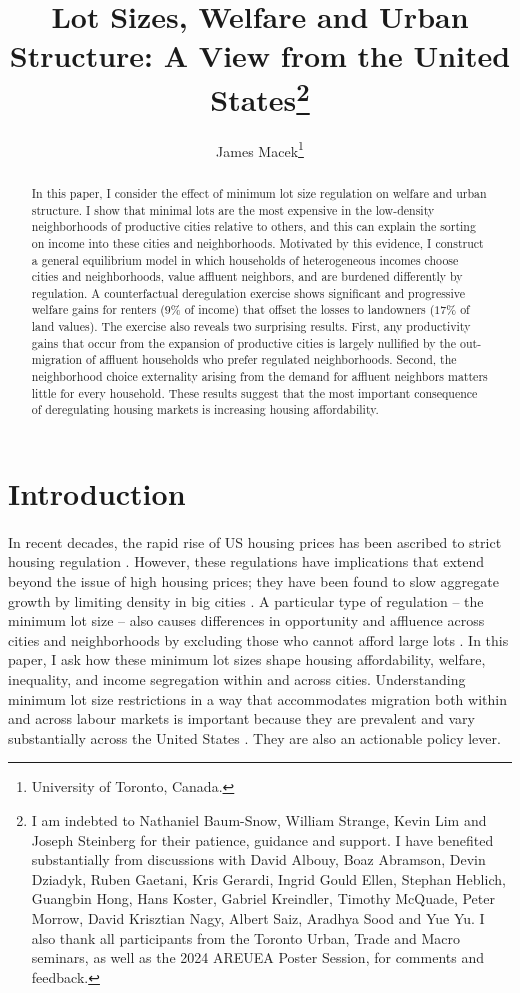 \documentclass[12pt]{article}
\title{Lot Sizes, Welfare and Urban Structure: A View from the United States\footnote{\scriptsize I am indebted to Nathaniel Baum-Snow, William Strange, Kevin Lim and Joseph Steinberg for their patience, guidance and support. I have benefited substantially from discussions with David Albouy, Boaz Abramson, Devin Dziadyk, Ruben Gaetani, Kris Gerardi, Ingrid Gould Ellen, Stephan Heblich, Guangbin Hong, Hans Koster, Gabriel Kreindler, Timothy McQuade, Peter Morrow, David Krisztian Nagy, Albert Saiz, Aradhya Sood and Yue Yu. I also thank all participants from the Toronto Urban, Trade and Macro seminars, as well as the 2024 AREUEA Poster Session, for comments and feedback.}}
\author{James Macek\footnote{\scriptsize University of Toronto, Canada.}}
\begin{document}
\maketitle	
		
\begin{abstract}
	\footnotesize
In this paper, I consider the effect of minimum lot size regulation on welfare and urban structure. I show that minimal lots are the most expensive in the low-density neighborhoods of productive cities relative to others, and this can explain the sorting on income into these cities and neighborhoods. Motivated by this evidence, I construct a general equilibrium model in which households of heterogeneous incomes choose cities and neighborhoods, value affluent neighbors, and are burdened differently by regulation. A counterfactual deregulation exercise shows significant and progressive welfare gains for renters ($9 \%$ of income) that offset the losses to landowners ($17\%$ of land values). The exercise also reveals two surprising results. First, any productivity gains that occur from the expansion of productive cities is largely nullified by the out-migration of affluent households who prefer regulated neighborhoods. Second, the neighborhood choice externality arising from the demand for affluent neighbors matters little for every household. These results suggest that the most important consequence of deregulating housing markets is increasing housing affordability. 


\end{abstract}	
	\newpage	
	\section{Introduction}
		
	\paragraph*{}
	
	In recent decades, the rapid rise of US housing prices has been ascribed to strict housing regulation \citep{molloynathansonpaciorek, superstarcities}. However, these regulations have implications that extend beyond the issue of high housing prices; they have been found to slow aggregate growth by limiting density in big cities \citep{hseihmoretti,durantonpugaurbgrowth}. A particular type of regulation -- the minimum lot size -- also causes differences in opportunity and affluence across cities and neighborhoods by excluding those who cannot afford large lots \citep{Song, kulka}. In this paper, I ask how these minimum lot sizes shape housing affordability, welfare, inequality, and income segregation within and across cities. Understanding minimum lot size restrictions in a way that accommodates migration both within and across labour markets is important because they are prevalent and vary substantially across the United States \citep{gyourko2021}. They are also an actionable policy lever. 
	
\end{document}
